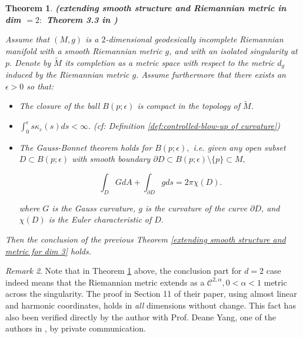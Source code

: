 \documentclass{amsart}
\let\oldcitep\citep
\renewcommand{\citep}[1]{\textcolor{blue}{\oldcitep{#1}}}
\let\oldcitet\citet
\renewcommand{\citet}[1]{\textcolor{blue}{\oldcitet{#1}}}
\newtheorem{theorem}{Theorem}[section]
\theoremstyle{definition}
\theoremstyle{remark}
\newtheorem{remark}[theorem]{Remark}
\newcommand{\nd}{\noindent}
\newcommand{\0}{\boldsymbol{0}}
\def\cC{\mathcal C}
\begin{document}
\begin{theorem}\label{extending smooth structure and metric for dim 2}\textbf{(extending smooth structure and Riemannian metric in dim $=2:$ Theorem 3.3 in \citep{SmithYang1992})}


\nd Assume that $(M,g)$ is a $2$-dimensional geodesically incomplete Riemannian manifold with a smooth Riemannian metric $g$, and with an isolated singularity at $p.$ Denote by $\widetilde{M}$ its completion as a metric space with respect to the metric $d_g$ induced by the Riemannian metric $g$. Assume furthermore that there exists an $\epsilon >0$ so that:\\

\begin{itemize}
    \item The closure of the ball $B(p;\epsilon)$ is compact in the topology of $\widetilde{M}$.
    \item $\int_{0}^{\epsilon}s\kappa_{\varepsilon}(s)ds < \infty.$  (cf: Definition \ref{def:controlled-blow-up of curvature})
    \item The Gauss-Bonnet theorem holds for $B(p;\epsilon),$ i.e. given any open subset $D\subset B(p;\epsilon)$ with smooth boundary $\partial D \subset B(p;\epsilon)\setminus \{p\}\subset M,$

    $$\int_D GdA + \int_{\partial{D}} gds = 2\pi \chi(D).$$

    \nd where $G$ is the Gauss curvature, $g$ is the curvature of the curve $\partial D$, and $\chi(D)$ is the Euler characteristic of $D.$
    
    
\end{itemize}

\nd Then the conclusion of the previous Theorem \ref{extending smooth structure and metric for dim 3} holds.
    
\end{theorem}

\begin{remark}
    Note that in Theorem \ref{extending smooth structure and metric for dim 2} above, the conclusion part for $d=2$ case indeed means that the Riemannian metric extends as a $\cC^{2, \alpha}, 0 < \alpha < 1$ metric across the singularity. The proof in Section 11 of their paper, using almost linear and harmonic coordinates, holds in \textit{all} dimensions without change. This fact has also been verified directly by the author with Prof. Deane Yang, one of the authors in \citet{SmithYang1992}, by private communication.
\end{remark}
\end{document}
